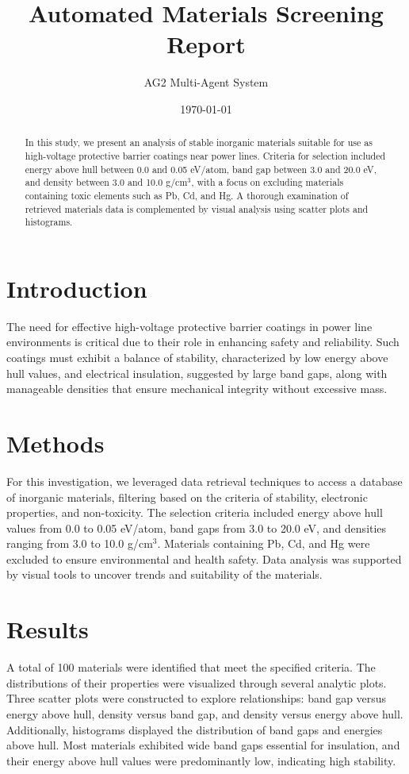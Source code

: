\documentclass{article}
\title{Automated Materials Screening Report}
\author{AG2 Multi-Agent System}
\date{\today}
\begin{document}
\maketitle

\begin{abstract}
In this study, we present an analysis of stable inorganic materials suitable for use as high-voltage protective barrier coatings near power lines. Criteria for selection included energy above hull between 0.0 and 0.05 eV/atom, band gap between 3.0 and 20.0 eV, and density between 3.0 and 10.0 g/cm$^{3}$, with a focus on excluding materials containing toxic elements such as Pb, Cd, and Hg. A thorough examination of retrieved materials data is complemented by visual analysis using scatter plots and histograms.
\end{abstract}

\section{Introduction}
The need for effective high-voltage protective barrier coatings in power line environments is critical due to their role in enhancing safety and reliability. Such coatings must exhibit a balance of stability, characterized by low energy above hull values, and electrical insulation, suggested by large band gaps, along with manageable densities that ensure mechanical integrity without excessive mass.

\section{Methods}
For this investigation, we leveraged data retrieval techniques to access a database of inorganic materials, filtering based on the criteria of stability, electronic properties, and non-toxicity. The selection criteria included energy above hull values from 0.0 to 0.05 eV/atom, band gaps from 3.0 to 20.0 eV, and densities ranging from 3.0 to 10.0 g/cm$^{3}$. Materials containing Pb, Cd, and Hg were excluded to ensure environmental and health safety. Data analysis was supported by visual tools to uncover trends and suitability of the materials.

\section{Results}
A total of 100 materials were identified that meet the specified criteria. The distributions of their properties were visualized through several analytic plots. Three scatter plots were constructed to explore relationships: band gap versus energy above hull, density versus band gap, and density versus energy above hull. Additionally, histograms displayed the distribution of band gaps and energies above hull. Most materials exhibited wide band gaps essential for insulation, and their energy above hull values were predominantly low, indicating high stability.
\end{document}

